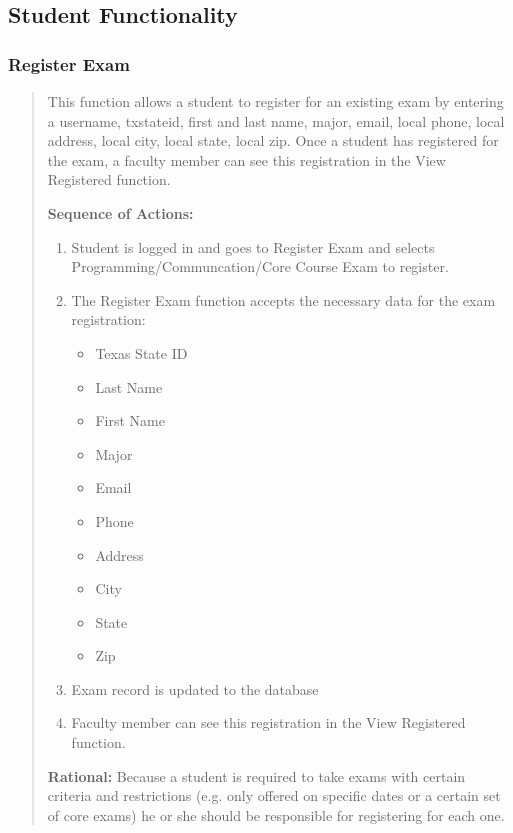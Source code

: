 \subsection*{Student Functionality}

\subsubsection{Register Exam}
\begin{quote} %
         This function allows a student to register for an existing exam by
         entering a username, txstateid, first and last name, major, email,
         local phone, local address, local city, local state, local zip.
         Once a student has registered for the exam, a faculty member can see
         this registration in the View Registered function.
         
         \textbf{Sequence of Actions:}
         \begin{enumerate}
            \item Student is logged in and goes to Register Exam and selects
               Programming/Communcation/Core Course Exam to register.
            \item The Register Exam function accepts the necessary data for the exam
               registration:
               \begin{itemize}
                  \item Texas State ID
                  \item Last Name
                  \item First Name
                  \item Major
                  \item Email
                  \item Phone
                  \item Address
                  \item City
                  \item State
                  \item Zip
               \end{itemize}
            \item Exam record is updated to the database
            \item Faculty member can see this registration in the View Registered
               function.
         \end{enumerate}

         \textbf{Rational:}
         Because a student is required to take exams with certain criteria and
         restrictions (e.g. only offered on specific dates or a certain set of
         core exams) he or she should be responsible for registering for each one.
   \end{quote} %

